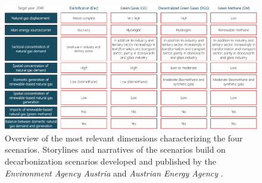 \afterpage{\clearpage}
\begin{figure}
	\includegraphics[width=1\linewidth]{figures/method/scenario_narrative.pdf}
	\caption{Overview of the most relevant dimensions characterizing the four scenarios. Storylines and narratives of the scenarios build on decarbonization scenarios developed and published by the \textit{Environment Agency Austria} \cite{umweltbundesamt} and \textit{Austrian Energy Agency} \cite{Energieagentur}.}
	\label{fig:scenario_narratives}
\end{figure} 
